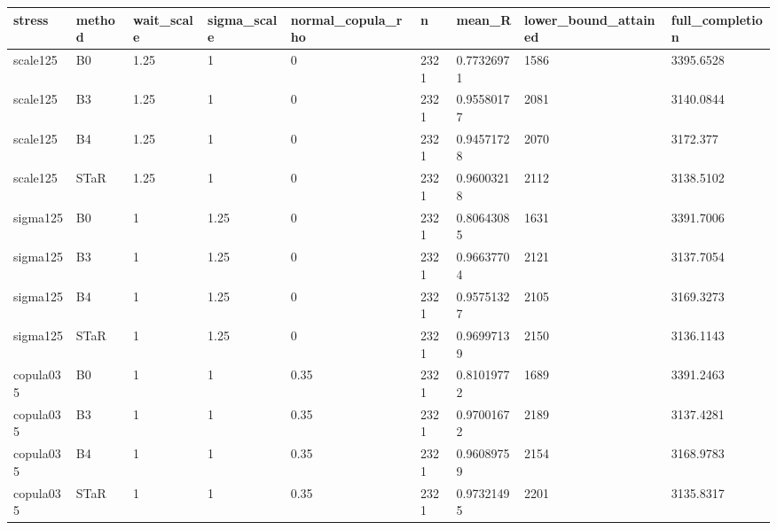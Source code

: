 \begin{tabular}{lllllllll}
\hline
stress & method & wait\_scale & sigma\_scale & normal\_copula\_rho & n & mean\_R & lower\_bound\_attained & full\_completion \\
\hline
scale125 & B0 & 1.25 & 1 & 0 & 2321 & 0.77326971 & 1586 & 3395.6528 \\
scale125 & B3 & 1.25 & 1 & 0 & 2321 & 0.95580177 & 2081 & 3140.0844 \\
scale125 & B4 & 1.25 & 1 & 0 & 2321 & 0.94571728 & 2070 & 3172.377 \\
scale125 & STaR & 1.25 & 1 & 0 & 2321 & 0.96003218 & 2112 & 3138.5102 \\
sigma125 & B0 & 1 & 1.25 & 0 & 2321 & 0.80643085 & 1631 & 3391.7006 \\
sigma125 & B3 & 1 & 1.25 & 0 & 2321 & 0.96637704 & 2121 & 3137.7054 \\
sigma125 & B4 & 1 & 1.25 & 0 & 2321 & 0.95751327 & 2105 & 3169.3273 \\
sigma125 & STaR & 1 & 1.25 & 0 & 2321 & 0.96997139 & 2150 & 3136.1143 \\
copula035 & B0 & 1 & 1 & 0.35 & 2321 & 0.81019772 & 1689 & 3391.2463 \\
copula035 & B3 & 1 & 1 & 0.35 & 2321 & 0.97001672 & 2189 & 3137.4281 \\
copula035 & B4 & 1 & 1 & 0.35 & 2321 & 0.96089759 & 2154 & 3168.9783 \\
copula035 & STaR & 1 & 1 & 0.35 & 2321 & 0.97321495 & 2201 & 3135.8317 \\
\hline
\end{tabular}
